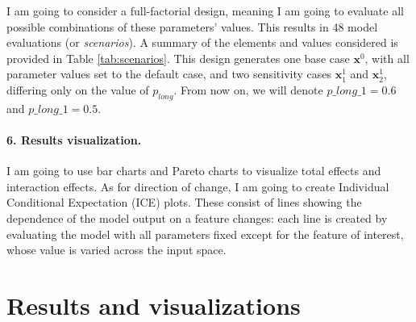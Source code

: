 I am going to consider a full-factorial design, meaning I am going to evaluate all possible combinations of these parameters' values. This results in 48 model evaluations (or \textit{scenarios}). A summary of the elements and values considered is provided in Table \ref{tab:scenarios}. This design generates one base case $\textbf{x}^0$, with all parameter values set to the default case, and two sensitivity cases $\textbf{x}_1^1$ and $\textbf{x}_2^1$, differing only on the value of $p_{long}$. From now on, we will denote $p\_long\_1 = 0.6$ and $p\_long\_1 = 0.5$. 


\begin{table}
    \centering
    \caption{Inputs and values considered for the sensitivity analysis.}
    \label{tab:scenarios}
\end{table}




\paragraph{6. Results visualization.}
I am going to use bar charts and Pareto charts to visualize total effects and interaction effects. As for direction of change, I am going to create Individual Conditional Expectation (ICE) plots. These consist of lines showing the dependence of the model output on a feature changes: each line is created by evaluating the model with all parameters fixed except for the feature of interest, whose value is varied across the input space.



\section{Results and visualizations} \label{sec:ch4_res}

